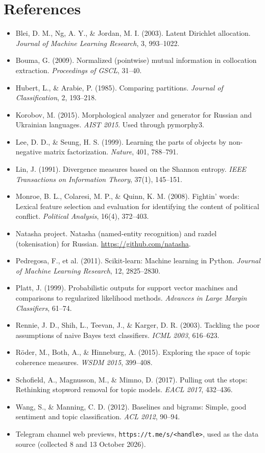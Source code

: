 \documentclass[11pt,a4paper]{article}
\begin{document}
\section*{References}
\begin{small}
\begin{itemize}[leftmargin=1.2em,label={}]
\setlength{\itemindent}{-1.2em}
\item Blei, D. M., Ng, A. Y., \& Jordan, M. I. (2003). Latent Dirichlet allocation. \emph{Journal of Machine Learning Research}, 3, 993--1022.
\item Bouma, G. (2009). Normalized (pointwise) mutual information in collocation extraction. \emph{Proceedings of GSCL}, 31--40.
\item Hubert, L., \& Arabie, P. (1985). Comparing partitions. \emph{Journal of Classification}, 2, 193--218.
\item Korobov, M. (2015). Morphological analyzer and generator for Russian and Ukrainian languages. \emph{AIST 2015}. Used through pymorphy3.
\item Lee, D. D., \& Seung, H. S. (1999). Learning the parts of objects by non-negative matrix factorization. \emph{Nature}, 401, 788--791.
\item Lin, J. (1991). Divergence measures based on the Shannon entropy. \emph{IEEE Transactions on Information Theory}, 37(1), 145--151.
\item Monroe, B. L., Colaresi, M. P., \& Quinn, K. M. (2008). Fightin' words: Lexical feature selection and evaluation for identifying the content of political conflict. \emph{Political Analysis}, 16(4), 372--403.
\item Natasha project. Natasha (named-entity recognition) and razdel (tokenisation) for Russian. \url{https://github.com/natasha}.
\item Pedregosa, F., et al. (2011). Scikit-learn: Machine learning in Python. \emph{Journal of Machine Learning Research}, 12, 2825--2830.
\item Platt, J. (1999). Probabilistic outputs for support vector machines and comparisons to regularized likelihood methods. \emph{Advances in Large Margin Classifiers}, 61--74.
\item Rennie, J. D., Shih, L., Teevan, J., \& Karger, D. R. (2003). Tackling the poor assumptions of naive Bayes text classifiers. \emph{ICML 2003}, 616--623.
\item Röder, M., Both, A., \& Hinneburg, A. (2015). Exploring the space of topic coherence measures. \emph{WSDM 2015}, 399--408.
\item Schofield, A., Magnusson, M., \& Mimno, D. (2017). Pulling out the stops: Rethinking stopword removal for topic models. \emph{EACL 2017}, 432--436.
\item Wang, S., \& Manning, C. D. (2012). Baselines and bigrams: Simple, good sentiment and topic classification. \emph{ACL 2012}, 90--94.
\item Telegram channel web previews, \texttt{https://t.me/s/<handle>}, used as the data source (collected 8 and 13 October 2026).
\end{itemize}
\end{small}
\end{document}
